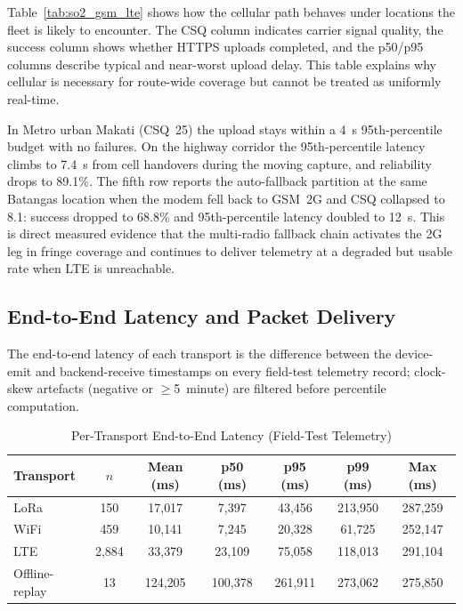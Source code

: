 Table~\ref{tab:so2_gsm_lte} shows how the cellular path behaves under locations the fleet is likely to encounter. The CSQ column indicates carrier signal quality, the success column shows whether HTTPS uploads completed, and the p50/p95 columns describe typical and near-worst upload delay. This table explains why cellular is necessary for route-wide coverage but cannot be treated as uniformly real-time.

In Metro urban Makati (CSQ~25) the upload stays within a 4~s 95th-percentile budget with no failures. On the highway corridor the 95th-percentile latency climbs to 7.4~s from cell handovers during the moving capture, and reliability drops to 89.1\%. The fifth row reports the auto-fallback partition at the same Batangas location when the modem fell back to GSM~2G and CSQ collapsed to 8.1: success dropped to 68.8\% and 95th-percentile latency doubled to 12~s. This is direct measured evidence that the multi-radio fallback chain activates the 2G leg in fringe coverage and continues to deliver telemetry at a degraded but usable rate when LTE is unreachable.

\subsection{End-to-End Latency and Packet Delivery}
The end-to-end latency of each transport is the difference between the device-emit and backend-receive timestamps on every field-test telemetry record; clock-skew artefacts (negative or $\geq$5~minute) are filtered before percentile computation.

\begin{table}[!htbp]
\centering
\caption{Per-Transport End-to-End Latency (Field-Test Telemetry)}
\label{tab:so2_latency}
\scriptsize
\setlength{\tabcolsep}{4pt}
\begin{tabular}{|l|c|c|c|c|c|c|}
\hline
\textbf{Transport} & \textbf{$n$} & \textbf{Mean (ms)} & \textbf{p50 (ms)} & \textbf{p95 (ms)} & \textbf{p99 (ms)} & \textbf{Max (ms)} \\
\hline
LoRa & 150 & 17{,}017 & 7{,}397 & 43{,}456 & 213{,}950 & 287{,}259 \\
\hline
WiFi & 459 & 10{,}141 & 7{,}245 & 20{,}328 & 61{,}725 & 252{,}147 \\
\hline
LTE & 2{,}884 & 33{,}379 & 23{,}109 & 75{,}058 & 118{,}013 & 291{,}104 \\
\hline
Offline-replay & 13 & 124{,}205 & 100{,}378 & 261{,}911 & 273{,}062 & 275{,}850 \\
\hline
\end{tabular}
\normalsize
\end{table}

